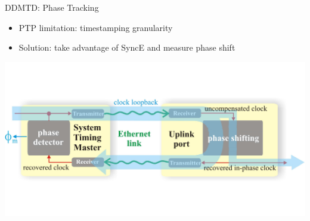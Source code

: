 \documentclass[compress,red]{beamer}
\begin{document}
\begin{frame}{DDMTD: Phase Tracking}
	\begin{center}
    \begin{itemize}
      \item PTP limitation: timestamping granularity
      \item Solution: take advantage of SyncE and measure phase shift
    \end{itemize}
		\includegraphics[width=.9\textwidth]{misc/phase_tracking_v2_simple.pdf}
	\end{center}

\end{frame}
\end{document}
